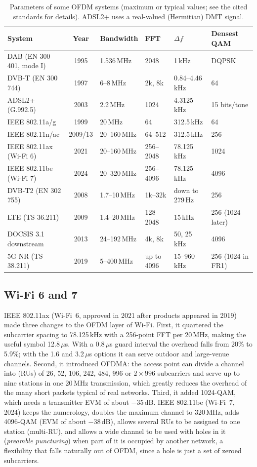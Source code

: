 \begin{table}[htbp]\centering\footnotesize
\caption{Parameters of some OFDM systems (maximum or typical values; see the cited standards for details). ADSL2+ uses a real-valued (Hermitian) DMT signal.}
\label{tab:ch17:systems}
\begin{tabular}{@{}l c l l l l@{}}
\toprule
System & Year & Bandwidth & FFT & $\Delta f$ & Densest QAM\\
\midrule
DAB (EN 300 401, mode I) & 1995 & 1.536\,MHz & 2048 & 1\,kHz & DQPSK\\
DVB-T (EN 300 744) & 1997 & 6--8\,MHz & 2k, 8k & 0.84--4.46\,kHz & 64\\
ADSL2+ (G.992.5) & 2003 & 2.2\,MHz & 1024 & 4.3125\,kHz & 15 bits/tone\\
IEEE 802.11a/g & 1999 & 20\,MHz & 64 & 312.5\,kHz & 64\\
IEEE 802.11n/ac & 2009/13 & 20--160\,MHz & 64--512 & 312.5\,kHz & 256\\
IEEE 802.11ax (Wi-Fi 6) & 2021 & 20--160\,MHz & 256--2048 & 78.125\,kHz & 1024\\
IEEE 802.11be (Wi-Fi 7) & 2024 & 20--320\,MHz & 256--4096 & 78.125\,kHz & 4096\\
DVB-T2 (EN 302 755) & 2008 & 1.7--10\,MHz & 1k--32k & down to 279\,Hz & 256\\
LTE (TS 36.211) & 2009 & 1.4--20\,MHz & 128--2048 & 15\,kHz & 256 (1024 later)\\
DOCSIS 3.1 downstream & 2013 & 24--192\,MHz & 4k, 8k & 50, 25\,kHz & 4096\\
5G NR (TS 38.211) & 2019 & 5--400\,MHz & up to 4096 & 15--960\,kHz & 256 (1024 in FR1)\\
\bottomrule
\end{tabular}
\end{table}

\subsection{Wi-Fi 6 and 7}

IEEE 802.11ax (Wi-Fi~6, approved in 2021 after products appeared in 2019) made three changes to the OFDM layer of
Wi-Fi. First, it quartered the subcarrier spacing to 78.125\,kHz with a 256-point FFT per 20\,MHz, making the
useful symbol 12.8\,$\mu$s. With a 0.8\,$\mu$s guard interval the overhead falls from 20\% to 5.9\%; with the 1.6 and
3.2\,$\mu$s options it can serve outdoor and large-venue channels. Second, it introduced OFDMA: the access point
can divide a channel into  (RUs) of 26, 52, 106, 242, 484, 996 or $2\times996$ subcarriers
and serve up to nine stations in one 20\,MHz transmission, which greatly reduces the overhead of the many short
packets typical of real networks. Third, it added 1024-QAM, which needs a transmitter EVM of about $-35$\,dB.
IEEE 802.11be (Wi-Fi~7, 2024) keeps the numerology, doubles the maximum channel to 320\,MHz, adds 4096-QAM
(EVM of about $-38$\,dB), allows several RUs to be assigned to one station (multi-RU), and allows a wide channel to
be used with holes in it (\emph{preamble puncturing}) when part of it is occupied by another network, a
flexibility that falls naturally out of OFDM, since a hole is just a set of zeroed subcarriers.

